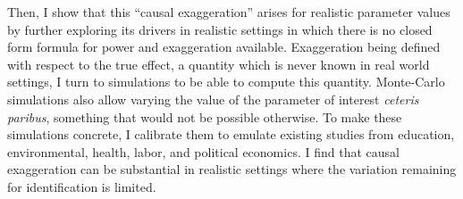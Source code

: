 			 Then, I show that this ``causal exaggeration'' arises for realistic parameter values by further exploring its drivers in realistic settings in which there is no closed form formula for power and exaggeration available. Exaggeration being defined with respect to the true effect, a quantity which is never known in real world settings, I turn to simulations to be able to compute this quantity. Monte-Carlo simulations also allow varying the value of the parameter of interest \textit{ceteris paribus}, something that would not be possible otherwise. To make these simulations concrete, I calibrate them to emulate existing studies from education, environmental, health, labor, and political economics. %
			I find that causal exaggeration can be substantial in realistic settings where the variation remaining for identification is limited. 
									
